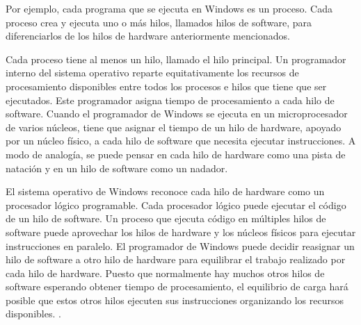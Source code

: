 \documentclass[12pt]{article}
\begin{document}
{Por ejemplo, cada programa que se ejecuta en Windows es un proceso. Cada proceso crea y ejecuta uno o más hilos, llamados hilos de software, para diferenciarlos de los hilos de hardware anteriormente mencionados.
\newline

Cada proceso tiene al menos un hilo, llamado el hilo principal. Un programador interno del sistema operativo reparte equitativamente los recursos de procesamiento disponibles entre todos los procesos e hilos que tiene que ser ejecutados. Este programador asigna tiempo de procesamiento a cada hilo de software. Cuando el programador de Windows se ejecuta en un microprocesador de varios núcleos, tiene que asignar el tiempo de un hilo de hardware, apoyado por un núcleo físico, a cada hilo de software que necesita ejecutar instrucciones. A modo de analogía, se puede pensar en cada hilo de hardware como una pista de natación y en un hilo de software como un nadador.\citep{Softm}
\newline

El sistema operativo de Windows reconoce cada hilo de hardware como un procesador lógico programable. Cada procesador lógico puede ejecutar el código de un hilo de software. Un proceso que ejecuta código en múltiples hilos de software puede aprovechar los hilos de hardware y los núcleos físicos para ejecutar instrucciones en paralelo. El programador de Windows puede decidir reasignar un hilo de software a otro hilo de hardware para equilibrar el trabajo realizado por cada hilo de hardware. Puesto que normalmente hay muchos otros hilos de software esperando obtener  tiempo de procesamiento, el equilibrio de carga hará posible que estos otros hilos ejecuten sus instrucciones organizando los recursos disponibles.
\citep{Softm}.


\medskip

 



}
\end{document}
